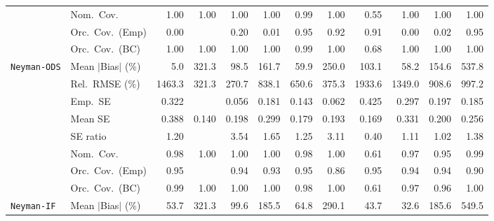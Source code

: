 \begin{landscape}
\begin{longtable}{llrrrrrrrrrr}
 & Nom.\ Cov. & \cellcolor{ranktwo}1.00 & \cellcolor{ranktwo}1.00 & \cellcolor{ranktwo}1.00 & \cellcolor{ranktwo}1.00 & \cellcolor{rankone}0.99 & \cellcolor{ranktwo}1.00 & \cellcolor{rankthree}0.55 & \cellcolor{ranktwo}1.00 & \cellcolor{ranktwo}1.00 & \cellcolor{ranktwo}1.00 \\
 & Orc.\ Cov.\ (Emp) & 0.00 &  & 0.20 & 0.01 & \cellcolor{rankone}0.95 & \cellcolor{ranktwo}0.92 & \cellcolor{rankthree}0.91 & 0.00 & 0.02 & \cellcolor{rankone}0.95 \\
 & Orc.\ Cov.\ (BC) & \cellcolor{ranktwo}1.00 & \cellcolor{ranktwo}1.00 & \cellcolor{ranktwo}1.00 & \cellcolor{ranktwo}1.00 & \cellcolor{rankone}0.99 & \cellcolor{ranktwo}1.00 & \cellcolor{rankthree}0.68 & \cellcolor{ranktwo}1.00 & \cellcolor{ranktwo}1.00 & \cellcolor{ranktwo}1.00 \\
\addlinespace[2pt]
\quad \texttt{Neyman-ODS} & Mean $|$Bias$|$ (\%) & \cellcolor{rankone}5.0 & 321.3 & 98.5 & 161.7 & \cellcolor{rankthree}59.9 & 250.0 & 103.1 & \cellcolor{ranktwo}58.2 & 154.6 & 537.8 \\
 & Rel.\ RMSE (\%) & 1463.3 & \cellcolor{ranktwo}321.3 & \cellcolor{rankone}270.7 & 838.1 & 650.6 & \cellcolor{rankthree}375.3 & 1933.6 & 1349.0 & 908.6 & 997.2 \\
 & Emp.\ SE & 0.322 &  & 0.056 & 0.181 & 0.143 & 0.062 & 0.425 & 0.297 & 0.197 & 0.185 \\
 & Mean SE & 0.388 & 0.140 & 0.198 & 0.299 & 0.179 & 0.193 & 0.169 & 0.331 & 0.200 & 0.256 \\
 & SE ratio & \cellcolor{rankthree}1.20 &  & 3.54 & 1.65 & 1.25 & 3.11 & 0.40 & \cellcolor{ranktwo}1.11 & \cellcolor{rankone}1.02 & 1.38 \\
 & Nom.\ Cov. & \cellcolor{rankthree}0.98 & 1.00 & 1.00 & 1.00 & \cellcolor{rankthree}0.98 & 1.00 & 0.61 & \cellcolor{ranktwo}0.97 & \cellcolor{rankone}0.95 & 0.99 \\
 & Orc.\ Cov.\ (Emp) & \cellcolor{rankone}0.95 &  & \cellcolor{ranktwo}0.94 & \cellcolor{rankthree}0.93 & \cellcolor{rankone}0.95 & 0.86 & \cellcolor{rankone}0.95 & \cellcolor{ranktwo}0.94 & \cellcolor{ranktwo}0.94 & 0.90 \\
 & Orc.\ Cov.\ (BC) & 0.99 & 1.00 & 1.00 & 1.00 & \cellcolor{rankthree}0.98 & 1.00 & 0.61 & \cellcolor{ranktwo}0.97 & \cellcolor{rankone}0.96 & 1.00 \\
\addlinespace[2pt]
\quad \texttt{Neyman-IF} & Mean $|$Bias$|$ (\%) & \cellcolor{rankthree}53.7 & 321.3 & 99.6 & 185.5 & 64.8 & 290.1 & \cellcolor{ranktwo}43.7 & \cellcolor{rankone}32.6 & 185.6 & 549.5 \\

\end{longtable}
\end{landscape}
